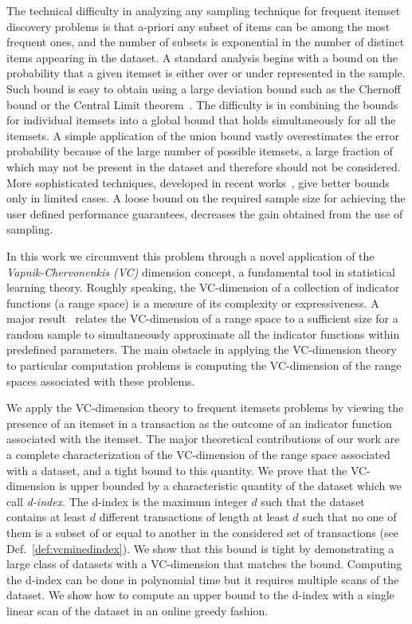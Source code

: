 The technical difficulty in analyzing any sampling technique for frequent
itemset discovery problems is that a-priori any subset of items can be among
the most frequent ones, and the number of subsets is exponential in the number
of distinct items appearing in the dataset. A standard analysis begins with a bound on
the probability that a given itemset is either over or under represented in the
sample. Such bound is easy to obtain using a large deviation bound such as the
Chernoff bound or the Central Limit theorem~\citep{MitzenmacherU05}. The
difficulty is in combining the bounds for individual itemsets
into a global bound that holds simultaneously for all the itemsets. A simple
application of the union bound vastly overestimates the error probability
because of the large number of possible itemsets, a large fraction of which may
not be present in the dataset and therefore should not be considered. More
sophisticated techniques, developed in recent
works~\citep{ChakaravarthyPS09,PietracaprinaRUV10,ChuangCY05}, give better
bounds only in limited cases. A loose bound 
 on the required sample size for achieving the user defined
 performance guarantees, decreases the gain obtained from the use of sampling. 

In this work we circumvent this problem 
through a novel application of the \emph{Vapnik-Chervonenkis (VC)} dimension
concept, a fundamental tool in statistical learning theory.  Roughly speaking,
the VC-dimension of a collection of indicator functions (a range space) is a
measure of its complexity or expressiveness. A major result~\citep{VapnikC71} relates the VC-dimension of
a range space to a sufficient size for a random sample to simultaneously
approximate all the indicator functions within predefined parameters. The main
obstacle in applying the VC-dimension theory to particular computation problems
is computing the VC-dimension of the range spaces associated with these
problems.  

We apply the VC-dimension theory to frequent itemsets problems by viewing the
presence of an itemset in a transaction as the outcome of an indicator function
associated with the itemset. The major theoretical contributions of our work are
a complete characterization of the VC-dimension of the range space associated
with a dataset, and a tight bound to this quantity. We prove that the VC-dimension
is upper bounded by a
characteristic quantity of the dataset
which we call \emph{d-index}. The d-index is the maximum integer $d$ such that the
dataset contains at least $d$ different transactions of length at least $d$ such
that no one of them is a subset of or equal to another in the considered set
of transactions (see Def.~\ref{def:vcminedindex}). We show that this bound is tight
by
demonstrating a large class of datasets with a VC-dimension that matches the
bound. Computing the d-index can be done in polynomial time but it requires
multiple scans of the dataset. We show how to compute an upper bound to the
d-index with a single linear scan of the dataset in an online greedy fashion.

